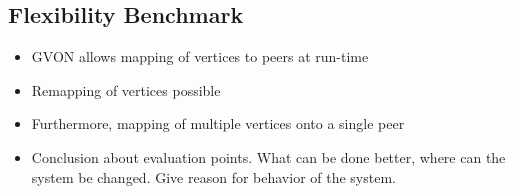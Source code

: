 \subsection{Flexibility Benchmark}

\begin{itemize}
\item GVON allows mapping of vertices to peers at run-time
\item Remapping of vertices possible
\item Furthermore, mapping of multiple vertices onto a single peer


\end{itemize}


\begin{itemize}
\item Conclusion about evaluation points. What can
  be done better, where can the system be changed.
  Give reason for behavior of the system.

\end{itemize}

\cleardoublepage

